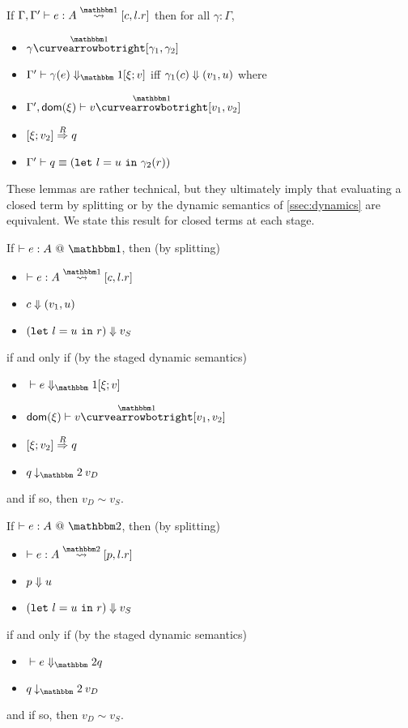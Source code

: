 \begin{lemma}
If $\Gamma, \Gamma'\vdash e : A \splitonesym [c,l.r]$ then for all $\gamma : \Gamma$,
\begin{itemize}
\item $\gamma \vsplito [\gamma_1, \gamma_2]$
\item $\diaone [\Gamma'] {\gamma(e)} {\xi;v}$ iff ${\gamma_1(c)} \Downarrow {(v_1,u)}$ where
\item $\Gamma',\dom \xi \vdash v \vsplito [v_1,v_2]$
\item $[{\xi};{v_2}]\overset{R}\Rightarrow{q}$
\item $\Gamma'\vdash q \equiv ({\tt let}~{l} = {u}~{\tt in}~{\gamma_2(r)})$
\end{itemize}
\end{lemma}

These lemmas are rather technical, but they ultimately imply that evaluating a
closed term by splitting or by the dynamic semantics of \ref{ssec:dynamics} are
equivalent. 
We state this result for closed terms at each stage.

\begin{theorem}
If $\vdash e:A~@~\bbone$, then (by splitting)
\begin{itemize}
\item $\vdash e : A \splitonesym [c,l.r]$
\item ${c} \Downarrow {(v_1,u)}$
\item ${({\tt let}~{l} = {u}~{\tt in}~{r})} \Downarrow {v}_S$
\end{itemize}
if and only if (by the staged dynamic semantics)
\begin{itemize}
\item $\diaone [] e {\xi;v}$
\item $\dom \xi \vdash v \vsplito [v_1,v_2]$
\item $[{\xi};{v_2}]\overset{R}\Rightarrow{q}$
\item $q \mathbin{\tworedsym} v_D$
\end{itemize}
and if so, then $v_D \sim v_S$.
\end{theorem}

\begin{theorem}
If $\vdash e:A~@~\bbtwo$, then (by splitting)
\begin{itemize}
\item $\vdash e : A \splittwosym [p,l.r]$
\item ${p} \Downarrow {u}$
\item ${({\tt let}~{l} = {u}~{\tt in}~{r})} \Downarrow {v_S}$
\end{itemize}
if and only if (by the staged dynamic semantics)
\begin{itemize}
\item $\diatwo [] e q$
\item $q \mathbin{\tworedsym} v_D$
\end{itemize}
and if so, then $v_D \sim v_S$.
\end{theorem}

